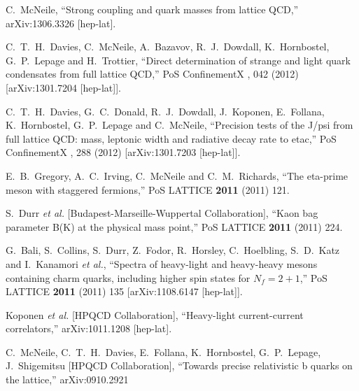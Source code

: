 \begin{thebibliography}{130}
  C.~McNeile,
  ``Strong coupling and quark masses from lattice QCD,''
  arXiv:1306.3326 [hep-lat].

  C.~T.~H.~Davies, C.~McNeile, A.~Bazavov, R.~J.~Dowdall,
  K.~Hornbostel, G.~P.~Lepage and H.~Trottier,
  ``Direct determination of strange and light quark condensates from
  full lattice QCD,''
  PoS ConfinementX {\bf }, 042 (2012)
  [arXiv:1301.7204 [hep-lat]].


  C.~T.~H.~Davies, G.~C.~Donald, R.~J.~Dowdall, J.~Koponen,
  E.~Follana, K.~Hornbostel, G.~P.~Lepage and C.~McNeile,
  ``Precision tests of the J/psi from full lattice QCD: mass,
  leptonic width and radiative decay rate to etac,''
  PoS ConfinementX {\bf }, 288 (2012)
  [arXiv:1301.7203 [hep-lat]].

  E.~B.~Gregory, A.~C.~Irving, C.~McNeile and C.~M.~Richards,
  ``The eta-prime meson with staggered fermions,''
  PoS LATTICE {\bf 2011} (2011) 121.

  S.~Durr {\it et al.}  [Budapest-Marseille-Wuppertal Collaboration],
  ``Kaon bag parameter B(K) at the physical mass point,''
  PoS LATTICE {\bf 2011} (2011) 224.


  G.~Bali, S.~Collins, S.~Durr, Z.~Fodor, R.~Horsley, C.~Hoelbling,
  S.~D.~Katz and I.~Kanamori {\it et al.},
  ``Spectra of heavy-light and heavy-heavy mesons containing charm
  quarks, including higher spin states for $N_f=2+ 1$,''
  PoS LATTICE {\bf 2011} (2011) 135
  [arXiv:1108.6147 [hep-lat]].



   Koponen {\it et al.}  [HPQCD Collaboration],
  ``Heavy-light current-current correlators,''
  arXiv:1011.1208 [hep-lat].


  C.~McNeile, C.~T.~H.~Davies, E.~Follana, K.~Hornbostel,
  G.~P.~Lepage, J.~Shigemitsu [HPQCD Collaboration],
  ``Towards precise relativistic b quarks on the lattice,''
  arXiv:0910.2921


\end{thebibliography}
